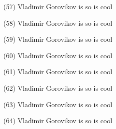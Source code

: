 \documentclass{article}%
\begin{document}
\begin{minipage}{0.3333333333333333\textwidth}%
(57) Vladimir Gorovikov%
\newline%
%
is so%
\newline%
%
is cool%
\newline%
%
\end{minipage}%
\newline%
\begin{minipage}{0.3333333333333333\textwidth}%
(58) Vladimir Gorovikov%
\newline%
%
is so%
\newline%
%
is cool%
\newline%
%
\end{minipage}%
\begin{minipage}{0.3333333333333333\textwidth}%
(59) Vladimir Gorovikov%
\newline%
%
is so%
\newline%
%
is cool%
\newline%
%
\end{minipage}%
\begin{minipage}{0.3333333333333333\textwidth}%
(60) Vladimir Gorovikov%
\newline%
%
is so%
\newline%
%
is cool%
\newline%
%
\end{minipage}%
\newline%
\begin{minipage}{0.3333333333333333\textwidth}%
(61) Vladimir Gorovikov%
\newline%
%
is so%
\newline%
%
is cool%
\newline%
%
\end{minipage}%
\begin{minipage}{0.3333333333333333\textwidth}%
(62) Vladimir Gorovikov%
\newline%
%
is so%
\newline%
%
is cool%
\newline%
%
\end{minipage}%
\begin{minipage}{0.3333333333333333\textwidth}%
(63) Vladimir Gorovikov%
\newline%
%
is so%
\newline%
%
is cool%
\newline%
%
\end{minipage}%
\newline%
\begin{minipage}{0.3333333333333333\textwidth}%
(64) Vladimir Gorovikov%
\newline%
%
is so%
\newline%
%
is cool%
\newline%
%
\end{minipage}%
\end{document}
